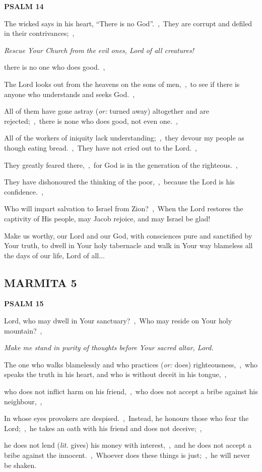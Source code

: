 \documentclass[12pt,twoside,a5paper]{article}
\newcommand{\marmita}[1]{\subsection*{MARMITA {#1}}}
\newcommand{\psalm}[1]{\textbf{PSALM {#1}}\nopagebreak}
\newcommand{\qanona}[1]{{\liturgicalhint{Qanona.} \emph{#1}}}
\newcommand{\slota}[1]{\liturgicalhint{Slota.} #1}
\newcommand{\translationoption}[1]{\emph{or:} #1}
\newcommand{\translationliteral}[1]{\emph{lit.} #1}
\begin{document}
\psalm{14}

\begin{normalparskip}
  The wicked says in his heart, ``There is no God''.~\sep\ They are corrupt and defiled in their contrivances;~\sep

  \qanona{Rescue Your Church from the evil ones, Lord of all creatures!}

  there is no one who does good.~\sep

  The Lord looks out from the heavens on the sons of men,~\sep\ to see if there is anyone who understands and seeks God.~\sep

  All of them have gone astray (\translationoption{turned away}) altogether and are rejected;~\sep\ there is none who does good, not even one.~\sep

  All of the workers of iniquity lack understanding;~\sep\ they devour my people as though eating bread.~\sep\ They have not cried out to the Lord.~\sep

  They greatly feared there,~\sep\ for God is in the generation of the righteous.~\sep

  They have dishonoured the thinking of the poor,~\sep\ because the Lord is his confidence.~\sep

  Who will impart salvation to Israel from Zion?~\sep\ When the Lord restores the captivity of His people, may Jacob rejoice, and may Israel be glad!
\end{normalparskip}

\slota{Make us worthy, our Lord and our God, with consciences pure and sanctified by Your truth, to dwell in Your holy tabernacle and walk in Your way blameless all the days of our life, Lord of all...}

\marmita{5}

\psalm{15}

\begin{normalparskip}
  Lord, who may dwell in Your sanctuary?~\sep\ Who may reside on Your holy mountain?~\sep

  \qanona{Make me stand in purity of thoughts before Your sacred altar, Lord.}

  The one who walks blamelessly and who practices (\translationoption{does}) righteousness,~\sep\ who speaks the truth in his heart, and who is without deceit in his tongue,~\sep

  who does not inflict harm on his friend,~\sep\ who does not accept a bribe against his neighbour,~\sep

  In whose eyes provokers are despised.~\sep\ Instead, he honours those who fear the Lord;~\sep\ he takes an oath with his friend and does not deceive;~\sep

  he does not lend (\translationliteral{gives}) his money with interest,~\sep\ and he does not accept a bribe against the innocent.~\sep\ Whoever does these things is just;~\sep\ he will never be shaken.
\end{normalparskip}
\end{document}
